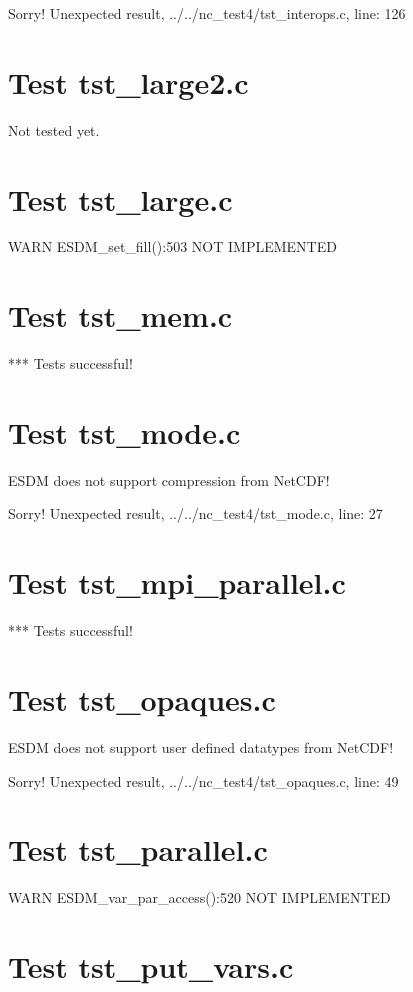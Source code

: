 Sorry! Unexpected result, ../../nc\_test4/tst\_interops.c, line: 126

\section{Test tst\_large2.c}

Not tested yet.

\section{Test tst\_large.c}

WARN ESDM\_set\_fill():503 NOT IMPLEMENTED

\section{Test tst\_mem.c}

*** Tests successful!

\section{Test tst\_mode.c}

ESDM does not support compression from NetCDF!

Sorry! Unexpected result, ../../nc\_test4/tst\_mode.c, line: 27

\section{Test tst\_mpi\_parallel.c}

*** Tests successful!

\section{Test tst\_opaques.c}

ESDM does not support user defined datatypes from NetCDF!

Sorry! Unexpected result, ../../nc\_test4/tst\_opaques.c, line: 49

\section{Test tst\_parallel.c}

WARN ESDM\_var\_par\_access():520 NOT IMPLEMENTED

\section{Test tst\_put\_vars.c}

